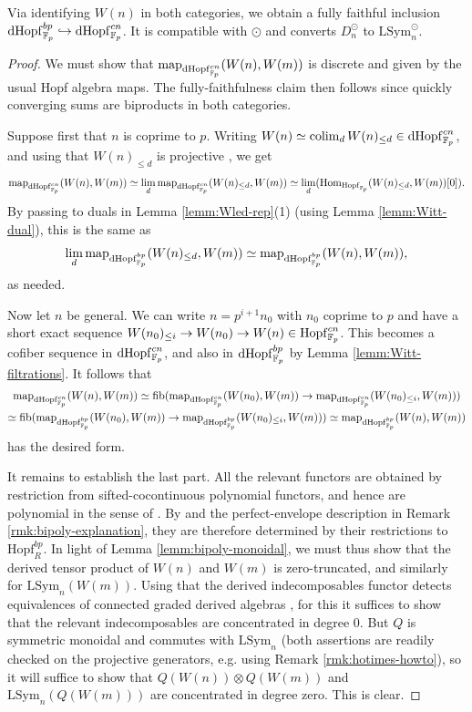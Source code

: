 \documentclass{amsart}
\renewcommand{\NB}[1]{}
\numberwithin{proposition}{section}
\numberwithin{equation}{section}
\def\LSym{\mathrm{LSym}}
\def\Hopf{\mathrm{Hopf}}
\def\dHopf{\mathrm{dHopf}}
\def\Hopf{\mathrm{Hopf}}
\def\hotimes{\odot}
\begin{document}
\begin{lemma} \label{lemm:dHopf-bp-nobp}
Via identifying $W(n)$ in both categories, we obtain a fully faithful inclusion $\dHopf_{\F_p}^{bp} \hookrightarrow \dHopf_{\F_p}^{cn}$.
It is compatible with $\hotimes$ and converts $D_n^\hotimes$ to $\LSym_n^\hotimes$.
\end{lemma}
\begin{proof}
We must show that $\map_{\dHopf_{\F_p}^{cn}}(W(n), W(m))$ is discrete and given by the usual Hopf algebra maps.
The fully-faithfulness claim then follows since quickly converging sums are biproducts in both categories.

Suppose first that $n$ is coprime to $p$.
Writing $W(n) \wequi \colim_d W(n)_{\le d} \in \dHopf_{\F_p}^{cn}$, and using that $W(n)_{\le d}$ is projective \cite[Lemma~4.1]{goerss-dieudonne}, we get \[ \map_{\dHopf_{\F_p}^{cn}}(W(n), W(m)) \wequi \lim_d \map_{\dHopf_{\F_p}^{cn}}(W(n)_{\le d}, W(m)) \wequi \lim_d (\Hom_{\Hopf_{\F_p}}(W(n)_{\le d}, W(m))[0]). \]
By passing to duals in Lemma \ref{lemm:Wled-rep}(1) (using Lemma \ref{lemm:Witt-dual}), this is the same as \[ \lim_d \map_{\dHopf_{\F_p}^{bp}}(W(n)_{\le d}, W(m)) \wequi \map_{\dHopf_{\F_p}^{bp}}(W(n), W(m)), \] as needed.

Now let $n$ be general.
We can write $n = p^{i+1} n_0$ with $n_0$ coprime to $p$ and have a short exact sequence $W(n_0)_{\le i} \to W(n_0) \to W(n) \in \Hopf_{\F_p}^{cn}$.
This becomes a cofiber sequence in $\dHopf_{\F_p}^{cn}$, and also in $\dHopf_{\F_p}^{bp}$ by Lemma \ref{lemm:Witt-filtrations}.
It follows that \begin{gather*} \map_{\dHopf_{\F_p}^{cn}}(W(n), W(m)) \wequi \fib(\map_{\dHopf_{\F_p}^{cn}}(W(n_0), W(m)) \to \map_{\dHopf_{\F_p}^{cn}}(W(n_0)_{\le i}, W(m))) \\ \wequi \fib(\map_{\dHopf_{\F_p}^{bp}}(W(n_0), W(m)) \to \map_{\dHopf_{\F_p}^{bp}}(W(n_0)_{\le i}, W(m))) \wequi \map_{\dHopf_{\F_p}^{bp}}(W(n), W(m)) \end{gather*} has the desired form.

It remains to establish the last part.
All the relevant functors are obtained by restriction from sifted-cocontinuous polynomial functors, and hence are polynomial in the sense of \cite[Proposition~2.15]{k-theory-and-poly-functors}.
By \cite[Theorem~2.19]{k-theory-and-poly-functors} and the perfect-envelope description in Remark \ref{rmk:bipoly-explanation}, they are therefore determined by their restrictions to $\Hopf_R^{bp}$.
In light of Lemma \ref{lemm:bipoly-monoidal}, we must thus show that the derived tensor product of $W(n)$ and $W(m)$ is zero-truncated, and similarly for $\LSym_n(W(m))$.
Using that the derived indecomposables functor detects equivalences of connected graded derived algebras \cite[Lemma 2.11]{brantner2025formal}, for this it suffices to show that the relevant indecomposables are concentrated in degree $0$.\NB{details?}
But $Q$ is symmetric monoidal and commutes with $\LSym_n$ (both assertions are readily checked on the projective generators, e.g. using Remark \ref{rmk:hotimes-howto}), so it will suffice to show that $Q(W(n)) \otimes Q(W(m))$ and $\LSym_n(Q(W(m)))$ are concentrated in degree zero.
This is clear.
\end{proof}
\end{document}
